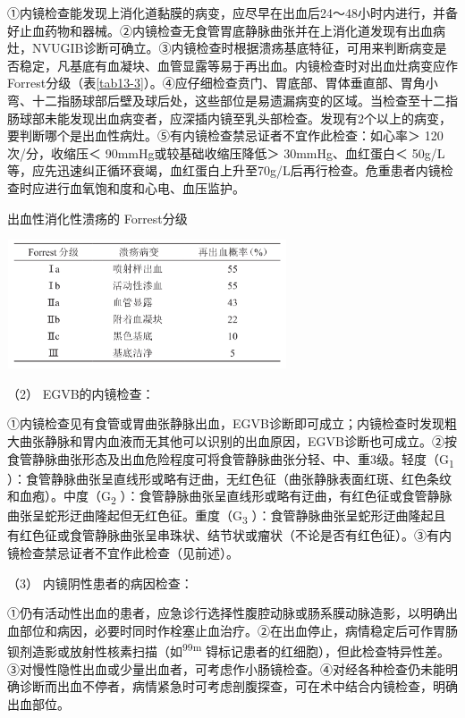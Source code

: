 ①内镜检查能发现上消化道黏膜的病变，应尽早在出血后24～48小时内进行，并备好止血药物和器械。②内镜检查无食管胃底静脉曲张并在上消化道发现有出血病灶，NVUGIB诊断可确立。③内镜检查时根据溃疡基底特征，可用来判断病变是否稳定，凡基底有血凝块、血管显露等易于再出血。内镜检查时对出血灶病变应作Forrest分级（表\ref{tab13-3}）。④应仔细检查贲门、胃底部、胃体垂直部、胃角小弯、十二指肠球部后壁及球后处，这些部位是易遗漏病变的区域。当检查至十二指肠球部未能发现出血病变者，应深插内镜至乳头部检查。发现有2个以上的病变，要判断哪个是出血性病灶。⑤有内镜检查禁忌证者不宜作此检查：如心率＞
120次/分，收缩压＜ 90mmHg或较基础收缩压降低＞ 30mmHg、血红蛋白＜
50g/L等，应先迅速纠正循环衰竭，血红蛋白上升至70g/L后再行检查。危重患者内镜检查时应进行血氧饱和度和心电、血压监护。

\begin{table}[htbp]
\centering
\caption{出血性消化性溃疡的 Forrest分级}
\label{tab13-3}
\includegraphics[width=3.26042in,height=1.5in]{./images/Image00055.jpg}
\end{table}

\hypertarget{text00032.htmlux5cux23CHP1-13-1-4-4-2-2}{}
（2） EGVB的内镜检查：

①内镜检查见有食管或胃曲张静脉出血，EGVB诊断即可成立；内镜检查时发现粗大曲张静脉和胃内血液而无其他可以识别的出血原因，EGVB诊断也可成立。②按食管静脉曲张形态及出血危险程度可将食管静脉曲张分轻、中、重3级。轻度（G\textsubscript{1}
）：食管静脉曲张呈直线形或略有迂曲，无红色征（曲张静脉表面红斑、红色条纹和血疱）。中度（G\textsubscript{2}
）：食管静脉曲张呈直线形或略有迂曲，有红色征或食管静脉曲张呈蛇形迂曲隆起但无红色征。重度（G\textsubscript{3}
）：食管静脉曲张呈蛇形迂曲隆起且有红色征或食管静脉曲张呈串珠状、结节状或瘤状（不论是否有红色征）。③有内镜检查禁忌证者不宜作此检查（见前述）。

\hypertarget{text00032.htmlux5cux23CHP1-13-1-4-4-2-3}{}
（3） 内镜阴性患者的病因检查：

①仍有活动性出血的患者，应急诊行选择性腹腔动脉或肠系膜动脉造影，以明确出血部位和病因，必要时同时作栓塞止血治疗。②在出血停止，病情稳定后可作胃肠钡剂造影或放射性核素扫描（如\textsuperscript{99m}
锝标记患者的红细胞），但此检查特异性差。③对慢性隐性出血或少量出血者，可考虑作小肠镜检查。④对经各种检查仍未能明确诊断而出血不停者，病情紧急时可考虑剖腹探查，可在术中结合内镜检查，明确出血部位。

